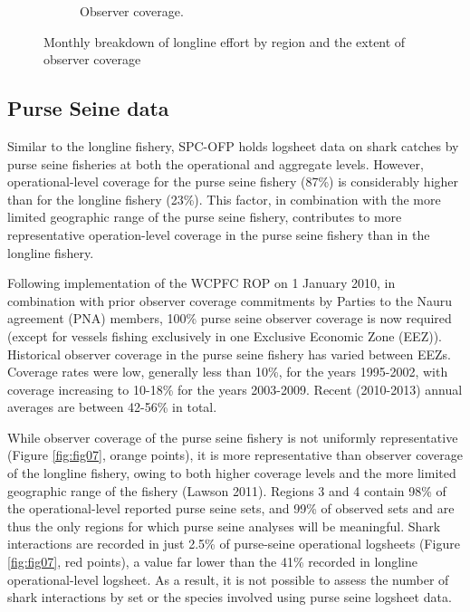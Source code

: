\documentclass[12pt]{SCreport}
\begin{document}
\begin{landscape}
\begin{figure}
\begin{subfigure}[b]{0.6\textwidth}
       \caption{Observer coverage.}
       \label{fig:test2}
   \end{subfigure}
\caption{Monthly breakdown of longline effort by region and the extent of observer coverage}
\label{fig:fig06} 
\end{figure}
\end{landscape}

\clearpage
 
 
 \subsection{Purse Seine data} 
Similar to the longline fishery, SPC-OFP holds logsheet data on shark catches by purse seine fisheries at both the operational and aggregate levels.  However, operational-level coverage for the purse seine fishery (87\%) is considerably higher than for the longline fishery (23\%). This factor, in combination with the more limited geographic range of the purse seine fishery, contributes to more representative operation-level coverage in the purse seine fishery than in the longline fishery.

Following implementation of the WCPFC ROP on 1 January 2010, in combination with prior observer coverage commitments by Parties to the Nauru agreement (PNA) members, 100\% purse seine observer coverage is now required (except for vessels fishing exclusively in one Exclusive Economic Zone (EEZ)). Historical observer coverage in the purse seine fishery has varied between EEZs. Coverage rates were low, generally less than 10\%, for the years 1995-2002, with coverage increasing to 10-18\% for the years 2003-2009. Recent (2010-2013) annual averages are between 42-56\% in total.


While observer coverage of the purse seine fishery is not uniformly representative (Figure \ref{fig:fig07}, orange points), it is more representative than observer coverage of the longline fishery, owing to both higher coverage levels and the more limited geographic range of the fishery (Lawson 2011). Regions 3 and 4 contain 98\% of the operational-level reported purse seine sets, and 99\% of observed sets and are thus the only regions for which purse seine analyses will be meaningful. Shark interactions are recorded in just 2.5\% of purse-seine operational logsheets (Figure \ref{fig:fig07}, red points), a value far lower than the 41\% recorded in longline operational-level logsheet. As a result, it is not possible to assess the number of shark interactions by set or the species involved using purse seine logsheet data.
\end{document}
